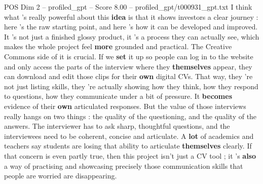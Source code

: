 \begin{textsample}{POS Dim 2 – profiled\_gpt – Score 8.00 – profiled\_gpt/t000931\_gpt.txt}  \label{ex:f2_pos_005}
I think what ’s really powerful about this \textbf{idea} is that it shows investors a clear journey : here ’s the raw starting point, and here ’s how it can be developed and improved.
It ’s not just a finished glossy product, it ’s a process they can actually see, which makes the whole project feel \textbf{more} grounded and practical.
The Creative Commons side of it is crucial.
If we \textbf{set} it up so people can log in to the website and only access the parts of the interview where they \textbf{themselves} appear, they can download and edit those clips for their \textbf{own} digital CVs.
That way, they ’re not just listing skills, they ’re actually showing how they think, how they respond to questions, how they communicate under a bit of pressure.
It \textbf{becomes} evidence of their \textbf{own} articulated responses.
But the value of those interviews really hangs on two things : the quality of the questioning, and the quality of the answers.
The interviewer has to ask sharp, thoughtful questions, and the interviewees need to be coherent, concise and articulate.
A \textbf{lot} of academics and teachers say students are losing that ability to articulate \textbf{themselves} clearly.
If that concern is even partly true, then this project isn't just a CV tool ; it ’s \textbf{also} a way of practising and showcasing precisely those communication skills that people are worried are disappearing.

\end{textsample}
